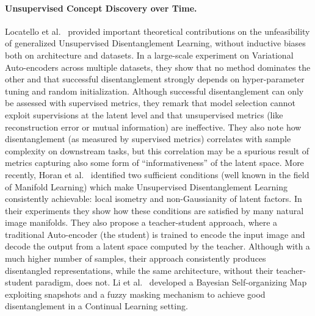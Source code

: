 \paragraph{Unsupervised Concept Discovery over Time.} Locatello et al.~\cite{locatello2019challenging} provided important theoretical contributions on the unfeasibility of generalized Unsupervised Disentanglement Learning, without inductive biases both on architecture and datasets. In a large-scale experiment on Variational Auto-encoders across multiple datasets, they show that no method dominates the other and that successful disentanglement strongly depends on hyper-parameter tuning and random initialization. Although successful disentanglement can only be assessed with supervised metrics, they remark that model selection cannot exploit supervisions at the latent level and that unsupervised metrics (like reconstruction error or mutual information) are ineffective.
They also note how %
disentanglement (as measured by supervised metrics) correlates with sample complexity on downstream tasks, but this correlation may be a spurious result of metrics capturing also some form of ``informativeness'' of the latent space.
%
More recently, Horan et al.~\cite{horan2021unsupervised} identified two sufficient conditions (well known in the field of Manifold Learning) which make Unsupervised Disentanglement Learning consistently achievable: local isometry and non-Gaussianity of latent factors. In their experiments they show how these conditions are satisfied by many natural image manifolds.%
%
They also propose a teacher-student approach, where a traditional Auto-encoder (the student) is trained to encode the input image and decode the output from a latent space computed by the teacher. %
%
Although with a much higher number of samples, their approach consistently produces disentangled representations, while the same architecture, without their teacher-student paradigm, does not.
Li et al.~\cite{li2022continual} developed a Bayesian Self-organizing Map exploiting snapshots and a fuzzy masking mechanism to achieve good disentanglement in a Continual Learning setting. 
